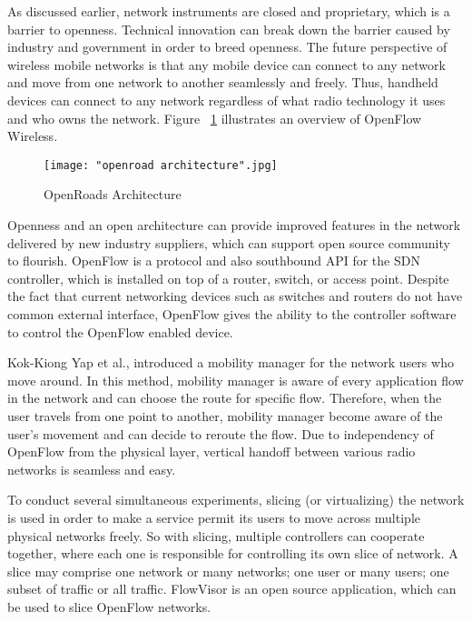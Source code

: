 \documentclass[english]{tktltiki2}
\theoremstyle{definition}
\theoremstyle{remark}
\begin{document}
As discussed earlier, network instruments are closed and proprietary, which is a barrier to openness. Technical innovation can break down the barrier caused by industry and government in order to breed openness. The future perspective of wireless mobile networks is that any mobile device can connect to any network and move from one network to another seamlessly and freely. Thus, handheld devices can connect to any network regardless of what radio technology it uses and who owns the network. Figure ~\ref{fig:openroads} illustrates an overview of OpenFlow Wireless. \cite{Yap10a}

\begin{figure}[h!t]
\centering
{}
\texttt{[image: "openroad architecture".jpg]}
\caption{OpenRoads Architecture \cite{Yap10b}}
\label{fig:openroads}
\end{figure}

Openness and an open architecture can provide improved features in the network delivered by new industry suppliers, which can support open source community to flourish. OpenFlow is a protocol and also southbound API for the SDN controller, which is installed on top of a router, switch, or access point. Despite the fact that current networking devices such as switches and routers do not have common external interface, OpenFlow gives the ability to the controller software to control the OpenFlow enabled device. 

Kok-Kiong Yap et al., introduced a mobility manager for the network users who move around. In this method, mobility manager is aware of every application flow in the network and can choose the route for specific flow. Therefore, when the user travels from one point to another, mobility manager become aware of the user’s movement and can decide to reroute the flow. Due to independency of OpenFlow from the physical layer, vertical handoff between various radio networks is seamless and easy. 

To conduct several simultaneous experiments, slicing (or virtualizing) the network is used in order to make a service permit its users to move across multiple physical networks freely. So with slicing, multiple controllers can cooperate together, where each one is responsible for controlling its own slice of network. A slice may comprise one network or many networks; one user or many users; one subset of traffic or all traffic. FlowVisor is an open source application, which can be used to slice OpenFlow networks. 
\end{document}
